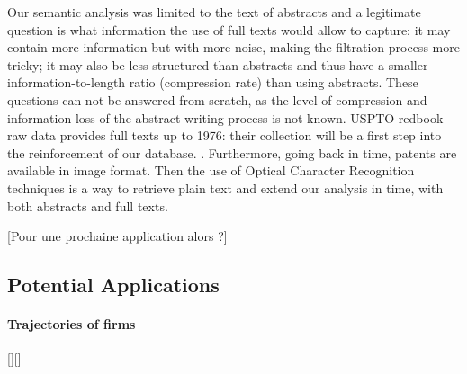 \documentclass[10pt,A4]{article}
\begin{document}

Our semantic analysis was limited to the text of abstracts and a legitimate question is what information the use of full texts would allow to capture: it may contain more information but with more noise, making the filtration process more tricky; it may also be less structured than abstracts and thus have a smaller information-to-length ratio (compression rate) than using abstracts. These questions can not be answered from scratch, as the level of compression and information loss of the abstract writing process is not known. USPTO redbook raw data provides full texts up to 1976: their collection will be a first step into the reinforcement of our database. . Furthermore, going back in time, patents are available in image format. Then the use of Optical Character Recognition techniques is a way to retrieve plain text and extend our analysis in time, with both abstracts and full texts.

[Pour une prochaine application alors ?]




\subsection{Potential Applications}



\paragraph{Trajectories of firms}

[][]
\end{document}
